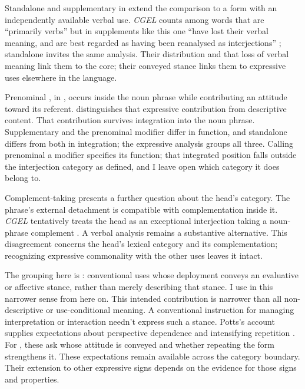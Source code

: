 \documentclass[12pt]{article}
\begin{document}
Standalone  and supplementary  in
 extend the comparison to a form
with an independently available verbal use. \textit{CGEL} counts
 among words that are \enquote{primarily verbs} but in
supplements like this one \enquote{have lost their verbal meaning, and are
best regarded as having been reanalysed as interjections}
\citep[1361]{HuddlestonPullum2002}; standalone  invites the
same analysis. Their distribution and that loss of verbal meaning link them
to the core; their conveyed stance links them to
expressive uses elsewhere in the language.

Prenominal , in , occurs inside the
noun phrase while contributing an attitude toward its referent.
\textcite[171, 182]{potts2007} distinguishes that expressive contribution
from descriptive content. That contribution survives integration into the
noun phrase. Supplementary  and the prenominal modifier differ
in function, and standalone  differs from both in
integration; the expressive analysis groups all three. Calling prenominal
 a modifier specifies its function; that integrated position
falls outside the interjection category as defined, and I leave open which
category it does belong to.

Complement-taking  presents a further
question about the head's category. The phrase's external detachment is
compatible with complementation inside it. \textit{CGEL} tentatively treats
the head as an exceptional interjection taking a noun-phrase complement
\citep[1361 n.~70]{HuddlestonPullum2002}. A verbal analysis remains a
substantive alternative. This disagreement concerns the head's lexical
category and its complementation; recognizing expressive commonality with
the other  uses leaves it intact.

The grouping here is : conventional uses whose
deployment conveys an evaluative or affective stance, rather than merely
describing that stance. I use  in this narrower sense from
here on. This intended contribution is narrower than
all non-descriptive or use-conditional meaning. A conventional instruction
for managing interpretation or interaction needn't express such a stance.
Potts's account supplies expectations about perspective dependence and
intensifying repetition \citep[166--167]{potts2007}. For ,
these ask whose attitude is conveyed and whether repeating the form
strengthens it. These expectations remain available across the category
boundary. Their extension to other expressive signs
depends on the evidence for those signs and properties.
\end{document}
